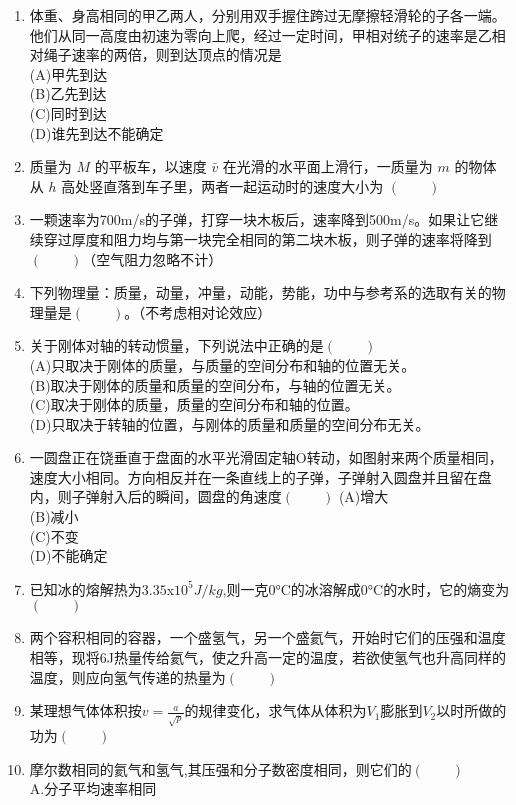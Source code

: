 \begin{enumerate}
\item 体重、身高相同的甲乙两人，分别用双手握住跨过无摩擦轻滑轮的子各一端。他们从同一高度由初速为零向上爬，经过一定时间，甲相对统子的速率是乙相对绳子速率的两倍，则到达顶点的情况是\\
(A)甲先到达\\
(B)乙先到达\\
(C)同时到达\\
(D)谁先到达不能确定
\item 质量为 $M$ 的平板车，以速度 $\bar v$ 在光滑的水平面上滑行，一质量为 $m$ 的物体从 $h$  高处竖直落到车子里，两者一起运动时的速度大小为 $(\qquad)$
\item  一颗速率为700m/s的子弹，打穿一块木板后，速率降到500m/s。如果让它继续穿过厚度和阻力均与第一块完全相同的第二块木板，则子弹的速率将降到$(\qquad)$（空气阻力忽略不计）
\item  下列物理量：质量，动量，冲量，动能，势能，功中与参考系的选取有关的物理量是$(\qquad)$。（不考虑相对论效应）
\item  关于刚体对轴的转动惯量，下列说法中正确的是$(\qquad)$\\
(A)只取决于刚体的质量，与质量的空间分布和轴的位置无关。\\
(B)取决于刚体的质量和质量的空间分布，与轴的位置无关。\\
(C)取决于刚体的质量，质量的空间分布和轴的位置。\\
(D)只取决于转轴的位置，与刚体的质量和质量的空间分布无关。
\item 一圆盘正在饶垂直于盘面的水平光滑固定轴O转动，如图射来两个质量相同，速度大小相同。方向相反并在一条直线上的子弹，子弹射入圆盘并且留在盘内，则子弹射入后的瞬间，圆盘的角速度$(\qquad)$
(A)增大\\
(B)减小\\
(C)不变\\
(D)不能确定
\item 已知冰的熔解热为$3.35$x$10^5J/kg$,则一克$0$°C的冰溶解成$0$°C的水时，它的熵变为$(\qquad)$
\item 两个容积相同的容器，一个盛氢气，另一个盛氦气，开始时它们的压强和温度相等，现将6J热量传给氦气，使之升高一定的温度，若欲使氢气也升高同样的温度，则应向氢气传递的热量为$(\qquad)$
\item 某理想气体体积按$\displaystyle v=\frac{a}{\sqrt{p}}$的规律变化，求气体从体积为$V_1$膨胀到$V_2$以时所做的功为$(\qquad)$
\item 摩尔数相同的氦气和氢气,其压强和分子数密度相同，则它们的$(\qquad)$\\
A.分子平均速率相同\\

\end{enumerate}
